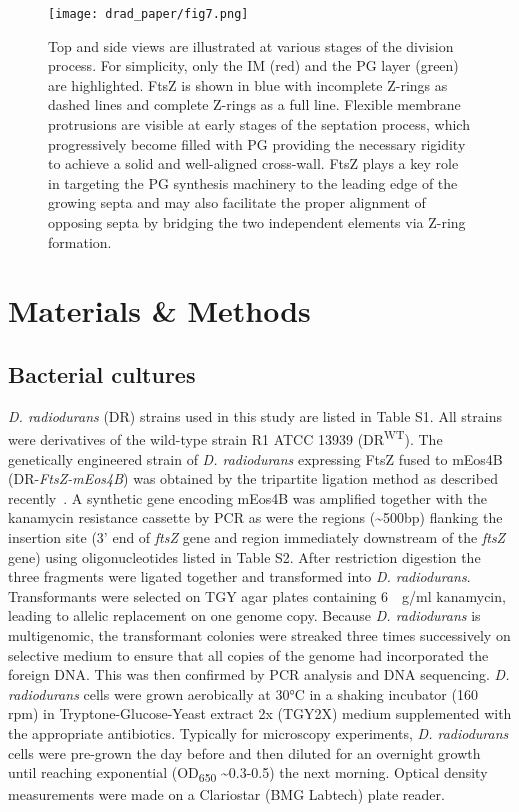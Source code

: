\begin{figure}[ht]
    \centering
    \texttt{[image: drad\_paper/fig7.png]}
    \caption[Schematic model of the septation process in D. radiodurans]{Top and side views are illustrated at various stages of the division process. For simplicity, only the IM (red) and the PG layer (green) are highlighted. FtsZ is shown in blue with incomplete Z-rings as dashed lines and complete Z-rings as a full line. Flexible membrane protrusions are visible at early stages of the septation process, which progressively become filled with PG providing the necessary rigidity to achieve a solid and well-aligned cross-wall. FtsZ plays a key role in targeting the PG synthesis machinery to the leading edge of the growing septa and may also facilitate the proper alignment of opposing septa by bridging the two independent elements via Z-ring formation.}
    \label{drad_fig7}
\end{figure}

\section{Materials \& Methods}

\subsection{Bacterial cultures}

\textit{D. radiodurans} (DR) strains used in this study are listed in Table S1.
All strains were derivatives of the wild-type strain R1 ATCC 13939 (DR\textsuperscript{WT}).
The genetically engineered strain of \textit{D. radiodurans} expressing FtsZ fused to mEos4B (DR-\textit{FtsZ-mEos4B}) was obtained by the tripartite ligation method as described recently~\cite{vauclareStressinducedNucleoidRemodeling2024}.
A synthetic gene encoding mEos4B was amplified together with the kanamycin resistance cassette by PCR as were the regions (\sim500bp) flanking the insertion site (3' end of \textit{ftsZ} gene and region immediately downstream of the \textit{ftsZ} gene) using oligonucleotides listed in Table S2.
After restriction digestion the three fragments were ligated together and transformed into \textit{D. radiodurans}.
Transformants were selected on TGY agar plates containing \qty{6}{\mu{}g/ml} kanamycin, leading to allelic replacement on one genome copy.
Because \textit{D. radiodurans} is multigenomic, the transformant colonies were streaked three times successively on selective medium to ensure that all copies of the genome had incorporated the foreign DNA.
This was then confirmed by PCR analysis and DNA sequencing.
\textit{D. radiodurans} cells were grown aerobically at \ang{30}C in a shaking incubator (160 rpm) in Tryptone-Glucose-Yeast extract 2x (TGY2X) medium supplemented with the appropriate antibiotics.
Typically for microscopy experiments, \textit{D. radiodurans} cells were pre-grown the day before and then diluted for an overnight growth until reaching exponential (OD\textsubscript{650} \sim0.3-0.5) the next morning.
Optical density measurements were made on a Clariostar (BMG Labtech) plate reader.

